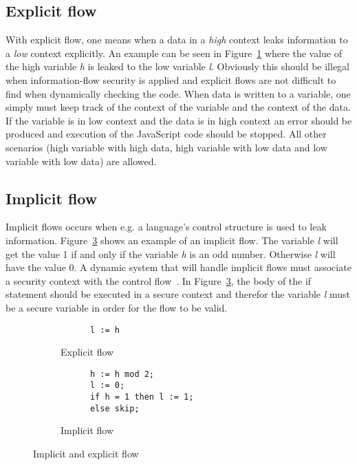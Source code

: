 \subsection{Explicit flow}
With explicit flow, one means when a data in a \emph{high} context leaks information to a \emph{low} context explicitly. An example can be seen in Figure~\ref{fig:expflow} where the value of the high variable \emph{h} is leaked to the low variable \emph{l}. Obviously this should be illegal when information-flow security is applied and explicit flows are not difficult to find when dynamically checking the code. When data is written to a variable, one simply must keep track of the context of the variable and the context of the data. If the variable is in low context and the data is in high context an error should be produced and execution of the JavaScript code should be stopped. All other scenarios (high variable with high data, high variable with low data and low variable with low data) are allowed.
\subsection{Implicit flow}
\label{chapter:implicit_flow}
Implicit flows occurs when e.g. a language's control structure is used to leak information. Figure~\ref{fig:impflow} shows an example of an implicit flow. The variable \emph{l} will get the value 1 if and only if the variable \emph{h} is an odd number. Otherwise \emph{l} will have the value 0. A dynamic system that will handle implicit flows must associate a security context with the control flow~\cite{jsflow-csf12}. In Figure~\ref{fig:impflow}, the body of the if statement should be executed in a secure context and therefor the variable \emph{l} must be a secure variable in order for the flow to be valid.

\begin{figure}[h]
  \captionsetup[subfigure]{singlelinecheck=off,justification=raggedright}
  \begin{subfigure}[b]{0.5\textwidth}
    \begin{lstlisting}
      l := h
    \end{lstlisting}
    \caption{Explicit flow}
    \label{fig:expflow}
  \end{subfigure}
  \begin{subfigure}[b]{0.5\textwidth}
    \begin{lstlisting}
      h := h mod 2;
      l := 0;
      if h = 1 then l := 1;
      else skip;
    \end{lstlisting}
    \caption{Implicit flow}
    \label{fig:impflow}
  \end{subfigure}
  \caption{Implicit and explicit flow}
\end{figure}

